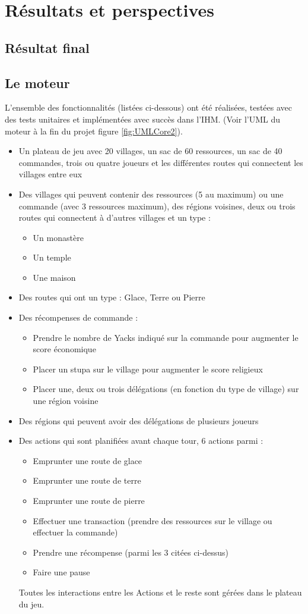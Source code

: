 \section{Résultats et perspectives}

\subsection{Résultat final}
\subsection{Le moteur}
L'ensemble des fonctionnalités (listées ci-dessous) ont été réalisées, testées avec des tests unitaires et implémentées avec succès dans l'IHM. (Voir l'UML du moteur à la fin du projet figure \ref{fig:UMLCore2}).
\begin{itemize}
	\item Un plateau de jeu avec 20 villages, un sac de 60 ressources, un sac de 40 commandes, trois ou quatre joueurs et les différentes routes qui connectent les villages entre eux
	\item Des villages qui peuvent contenir des ressources (5 au maximum) ou une commande (avec 3 ressources maximum), des régions voisines, deux ou trois routes qui connectent à d'autres villages et un type :
	\begin{itemize}
		\item Un monastère
		\item Un temple
		\item Une maison
	\end{itemize}
	\item Des routes qui ont un type : Glace, Terre ou Pierre
	\item Des récompenses de commande : 
	\begin{itemize}
		\item Prendre le nombre de Yacks indiqué sur la commande pour augmenter le score économique
		\item Placer un stupa sur le village pour augmenter le score religieux
		\item Placer une, deux ou trois délégations (en fonction du type de village) sur une région voisine
	\end{itemize}
	\item Des régions qui peuvent avoir des délégations de plusieurs joueurs
	\item Des actions qui sont planifiées avant chaque tour, 6 actions parmi : 
	\begin{itemize}
		\item Emprunter une route de glace
		\item Emprunter une route de terre
		\item Emprunter une route de pierre
		\item Effectuer une transaction (prendre des ressources sur le village ou effectuer la commande)
		\item Prendre une récompense (parmi les 3 citées ci-dessus)
		\item Faire une pause
	\end{itemize}
	Toutes les interactions entre les Actions et le reste sont gérées dans le plateau du jeu.
\end{itemize} 
